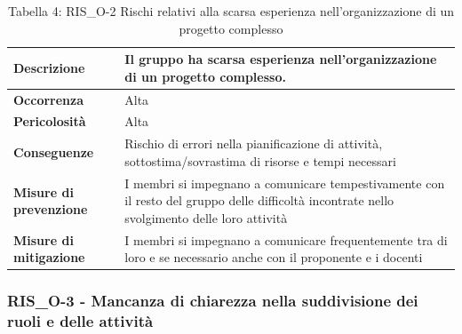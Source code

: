 \documentclass[a4paper,10pt]{article}
\begin{document}
\begin{table}[H]
\centering
\renewcommand{\arraystretch}{1.3}

\begin{tabularx}{\textwidth}{|p{4cm}|X|}
\hline
\textbf{Descrizione} & 
Il gruppo ha scarsa esperienza nell'organizzazione di un progetto complesso. \\ \hline

\textbf{Occorrenza} & Alta \\ \hline

\textbf{Pericolosità} & Alta \\ \hline

\textbf{Conseguenze} & 
Rischio di errori nella pianificazione di attività, sottostima/sovrastima di risorse e tempi necessari \\ \hline

\textbf{Misure di prevenzione} & I membri si impegnano a comunicare tempestivamente con il resto del gruppo delle difficoltà incontrate nello svolgimento delle loro attività \\ \hline

\textbf{Misure di mitigazione} &
I membri si impegnano a comunicare frequentemente tra di loro e se necessario anche con il proponente e i docenti \\ \hline

\end{tabularx}

\caption{Tabella 4: RIS\_O-2 Rischi relativi alla scarsa esperienza nell'organizzazione di un progetto complesso}
\end{table}


\subsubsection{RIS\_O-3 - Mancanza di chiarezza nella suddivisione dei ruoli e delle attività}
\end{document}
